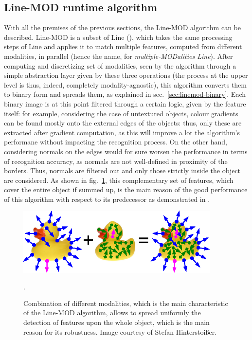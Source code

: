 \subsection{Line-MOD runtime algorithm} \label{sec:linemod-usage}
With all the premises of the previous sections, the Line-MOD algorithm
can be described. Line-MOD is a subset of Line
(\cite{linemod-origins}), which takes the same processing steps of
Line and applies it to match multiple features, computed from
different modalities, in parallel (hence the name, for
\emph{multiple-MODalities Line}). After computing and discretizing
set of modalities, seen by the algorithm through a simple abstraction
layer given by these three operations (the process at the upper level
is thus, indeed, completely modality-agnostic), this algorithm
converts them to binary form and spreads them, as explained in
sec.~\ref{sec:linemod-binary}. Each binary image is at this point filtered
through a certain logic, given by the feature itself: for example,
considering the case of untextured objects, colour gradients can be
found mostly onto the external edges of the objects: thus, only these
are extracted after gradient computation, as this will improve a lot
the algorithm's performane without impacting the recognition
process. %
On the other hand, considering normals on the edges would for sure
worsen the performance in terms of recognition accuracy, as normals
are not well-defined in proximity of the borders. Thus, normals are
filtered out and only those strictly inside the object are
considered. As shown in fig.~\ref{fig:duck-linemod}, this
complementary set of features, which cover the entire object if summed
up, is the main reason of the good performance of this algorithm with
respect to its predecessor as demonstrated in \cite{linemod-paper}.

\begin{figure}[htbp]
\centering
\includegraphics[width=4in]{./Graphics/duck-linemod}
\caption{Combination of different modalities, which is the main
  characteristic of the Line-MOD algorithm, allows to spread uniformly
  the detection of features upon the whole object, which is the main
  reason for its robustness. Image courtesy of Stefan Hinterstoi\ss er. \label{fig:duck-linemod}}.
\end{figure}
